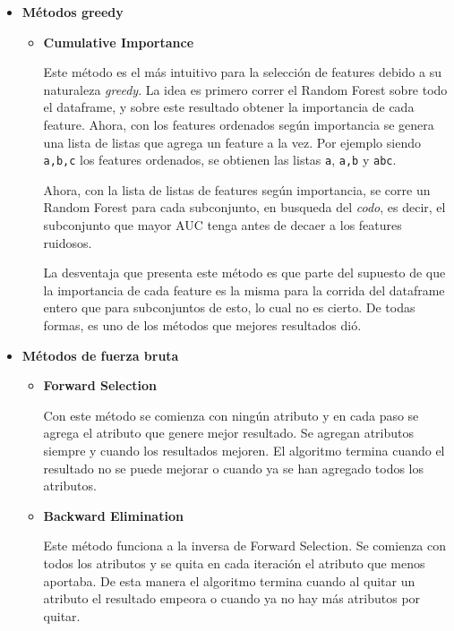 \documentclass[a4paper]{article}
\begin{document}
\begin {itemize}

\item \textbf{Métodos greedy}

\begin {itemize}

	\item \textbf{Cumulative Importance}

	Este método es el más intuitivo para la selección de features debido a su naturaleza \textit{greedy}. La idea es primero correr el Random Forest sobre todo el dataframe, y sobre este resultado obtener la importancia de cada feature. Ahora, con los features ordenados según importancia se genera una lista de listas que agrega un feature a la vez. Por ejemplo siendo \texttt{a,b,c} los features ordenados, se obtienen las listas \texttt{a}, \texttt{a,b} y  \texttt{abc}.

	Ahora, con la lista de listas de features según importancia, se corre un Random Forest para cada subconjunto, en busqueda del \textit{codo}, es decir, el subconjunto que mayor AUC tenga antes de decaer a los features ruidosos.

	La desventaja que presenta este método es que parte del supuesto de que la importancia de cada feature es la misma para la corrida del dataframe entero que para subconjuntos de esto, lo cual no es cierto. De todas formas, es uno de los métodos que mejores resultados dió.

\end{itemize}

\item \textbf{Métodos de fuerza bruta}

\begin{itemize}

	\item \textbf{Forward Selection}

	Con este método se comienza con ningún atributo y en cada paso se agrega el atributo que genere mejor resultado. Se agregan atributos siempre y cuando los resultados mejoren. El algoritmo termina cuando el resultado no se puede mejorar o cuando ya se han agregado todos los atributos.

	\item \textbf{Backward Elimination}

	Este método funciona a la inversa de Forward Selection. Se comienza con todos los atributos y se quita en cada iteración el atributo que menos aportaba. De esta manera el algoritmo termina cuando al quitar un atributo el resultado empeora o cuando ya no hay más atributos por quitar.


\end{itemize}
\end{itemize}
\end{document}
